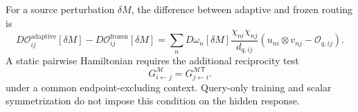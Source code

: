 For a source perturbation $\delta M$, the difference between adaptive and frozen routing is
\begin{equation}
D\mathcal O_{ij}^{\mathrm{adaptive}}[\delta M]-D\mathcal O_{ij}^{\mathrm{frozen}}[\delta M]
=\sum_nD\omega_n[\delta M]\frac{\chi_{ni}\chi_{nj}}{d_{q,ij}}
\left(u_{ni}\otimes v_{nj}-\mathcal O_{q,ij}\right).
\label{eq:msa-pairformer-router-mediated-response}
\end{equation}
A static pairwise Hamiltonian requires the additional reciprocity test
\begin{equation}
G_{i\leftarrow j}^{\mathcal M}=G_{j\leftarrow i}^{\mathcal M\mathsf T}.
\label{eq:msa-pairformer-reciprocity-test}
\end{equation}
under a common endpoint-excluding context.  Query-only training and scalar symmetrization do not
impose this condition on the hidden response.
